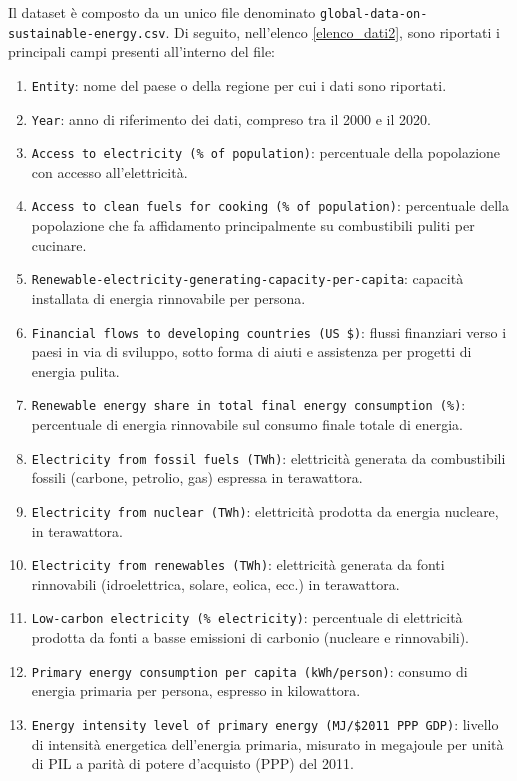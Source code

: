 Il dataset è composto da un unico file denominato \texttt{global-data-on-sustainable-energy.csv}. Di seguito, nell'elenco \ref{elenco_dati2}, sono riportati i principali campi presenti all'interno del file:
\vspace{2mm}
\begin{enumerate}
\label{elenco_dati2}
    \item \texttt{Entity}: nome del paese o della regione per cui i dati sono riportati.
    \item \texttt{Year}: anno di riferimento dei dati, compreso tra il 2000 e il 2020.
    \item \texttt{Access to electricity (\% of population)}: percentuale della popolazione con accesso all'elettricità.
    \item \texttt{Access to clean fuels for cooking (\% of population)}: percentuale della popolazione che fa affidamento principalmente su combustibili puliti per cucinare.
    \item \texttt{Renewable-electricity-generating-capacity-per-capita}: capacità installata di energia rinnovabile per persona.
    \item \texttt{Financial flows to developing countries (US \$)}: flussi finanziari verso i paesi in via di sviluppo, sotto forma di aiuti e assistenza per progetti di energia pulita.
    \item \texttt{Renewable energy share in total final energy consumption (\%)}: percentuale di energia rinnovabile sul consumo finale totale di energia.
    \item \texttt{Electricity from fossil fuels (TWh)}: elettricità generata da combustibili fossili (carbone, petrolio, gas) espressa in terawattora.
    \item \texttt{Electricity from nuclear (TWh)}: elettricità prodotta da energia nucleare, in terawattora.
    \item \texttt{Electricity from renewables (TWh)}: elettricità generata da fonti rinnovabili (idroelettrica, solare, eolica, ecc.) in terawattora.
    \item \texttt{Low-carbon electricity (\% electricity)}: percentuale di elettricità prodotta da fonti a basse emissioni di carbonio (nucleare e rinnovabili).
    \item \texttt{Primary energy consumption per capita (kWh/person)}: consumo di energia primaria per persona, espresso in kilowattora.
    \item \texttt{Energy intensity level of primary energy (MJ/\$2011 PPP GDP)}: livello di intensità energetica dell'energia primaria, misurato in megajoule per unità di PIL a parità di potere d'acquisto (PPP) del 2011.

\end{enumerate}
